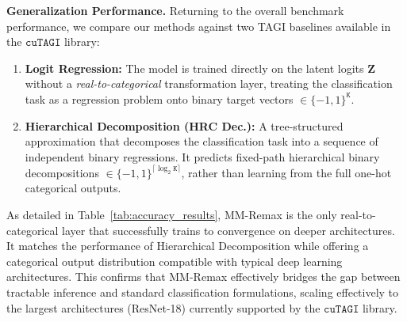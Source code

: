 \documentclass{uai2026} %
\begin{document}
\textbf{Generalization Performance.}
Returning to the overall benchmark performance, we compare our methods against two TAGI baselines available in the $\mathtt{cuTAGI}$ library:
\begin{enumerate}
    \item \textbf{Logit Regression:} The model is trained directly on the latent logits $\bm{Z}$ without a \textit{real-to-categorical} transformation layer, treating the classification task as a regression problem onto binary target vectors $\in \{-1, 1\}^{\mathtt{K}}$.
    \item \textbf{Hierarchical Decomposition (HRC Dec.):} A tree-structured approximation that decomposes the classification task into a sequence of independent binary regressions. It predicts fixed-path hierarchical binary decompositions $\in \{-1, 1\}^{\lceil \log_2 \mathtt{K} \rceil}$, rather than learning from the full one-hot categorical outputs.
\end{enumerate}

As detailed in Table~\ref{tab:accuracy_results}, MM-Remax is the only real-to-categorical layer that successfully trains to convergence on deeper architectures. It matches the performance of Hierarchical Decomposition \citep{goulet2021tractable} while offering a categorical output distribution compatible with typical deep learning architectures. This confirms that MM-Remax effectively bridges the gap between tractable inference and standard classification formulations, scaling effectively to the largest architectures (ResNet-18) currently supported by the $\mathtt{cuTAGI}$ library.

\begin{table}[t]
\centering
\caption{Test accuracy (\%) on MNIST and CIFAR-10 using TAGI (Mean $\pm$ Std. over 20 seeds).}
\label{tab:accuracy_results}
\end{table}
\end{document}
